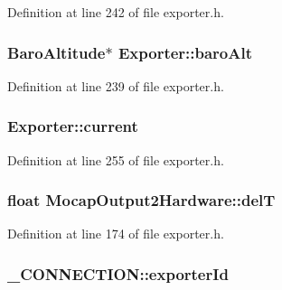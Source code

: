 \-Definition at line 242 of file exporter.\-h.

\hypertarget{group___mo_cap_plugin_ga15711fcb53727148f4c62b5bfa1ce9f1}{
\subsubsection[{baro\-Alt}]{\setlength{\rightskip}{0pt plus 5cm}\-Baro\-Altitude$\ast$ {\bf \-Exporter\-::baro\-Alt}}}\label{group___mo_cap_plugin_ga15711fcb53727148f4c62b5bfa1ce9f1}


\-Definition at line 239 of file exporter.\-h.

\hypertarget{group___mo_cap_plugin_ga6c17ed61598da30f012113ffbff26816}{
\subsubsection[{current}]{ {\bf \-Exporter\-::current}}}\label{group___mo_cap_plugin_ga6c17ed61598da30f012113ffbff26816}


\-Definition at line 255 of file exporter.\-h.

\hypertarget{group___mo_cap_plugin_ga0c6d6722adb60229659cfe26d61ec953}{
\subsubsection[{del\-T}]{\setlength{\rightskip}{0pt plus 5cm}float {\bf \-Mocap\-Output2\-Hardware\-::del\-T}}}\label{group___mo_cap_plugin_ga0c6d6722adb60229659cfe26d61ec953}


\-Definition at line 174 of file exporter.\-h.

\hypertarget{group___mo_cap_plugin_ga2bff4ba6b082ec966a7075df9e19d66b}{
\subsubsection[{exporter\-Id}]{ {\bf \-\_\-\-C\-O\-N\-N\-E\-C\-T\-I\-O\-N\-::exporter\-Id}}}\label{group___mo_cap_plugin_ga2bff4ba6b082ec966a7075df9e19d66b}


